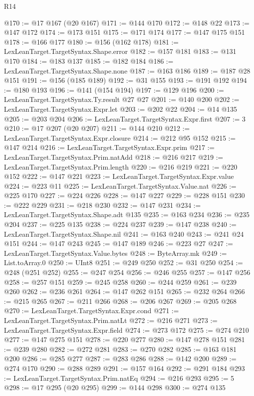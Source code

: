 \begin{lexlean}{R14}
\begin{coremodule}
@170 := @17 @167 (@20 @167)
@171 := @144 @170
@172 := @148 @22
@173 := @147 @172
@174 := @173 @151
@175 := @171 @174
@177 := @147 @175 @151
@178 := @166 @177
@180 := @156 (@162 @178)
@181 := LexLeanTarget.TargetSyntax.Shape.error
@182 := @157 @181
@183 := @131 @170
@184 := @183 @137
@185 := @182 @184
@186 := LexLeanTarget.TargetSyntax.Shape.none
@187 := @163 @186
@189 := @187 @28 @151
@191 := @156 (@185 @189)
@192 := @31 @155
@193 := @191 @192
@194 := @180 @193
@196 := @141 (@154 @194)
@197 := @129 @196
@200 := LexLeanTarget.TargetSyntax.Ty.result @27 @27
@201 := @140 @200
@202 := LexLeanTarget.TargetSyntax.Expr.let
@203 := @202 @22
@204 := @14 @135
@205 := @203 @204
@206 := LexLeanTarget.TargetSyntax.Expr.first
@207 := 3
@210 := @17 @207 (@20 @207)
@211 := @144 @210
@212 := LexLeanTarget.TargetSyntax.Expr.closure
@214 := @212 @95 @152
@215 := @147 @214
@216 := LexLeanTarget.TargetSyntax.Expr.prim
@217 := LexLeanTarget.TargetSyntax.Prim.natAdd
@218 := @216 @217
@219 := LexLeanTarget.TargetSyntax.Prim.length
@220 := @216 @219
@221 := @220 @152
@222 := @147 @221
@223 := LexLeanTarget.TargetSyntax.Expr.value
@224 := @223 @11
@225 := LexLeanTarget.TargetSyntax.Value.nat
@226 := @225 @170
@227 := @224 @226
@228 := @147 @227
@229 := @228 @151
@230 := @222 @229
@231 := @218 @230
@232 := @147 @231
@234 := LexLeanTarget.TargetSyntax.Shape.adt @135
@235 := @163 @234
@236 := @235 @204
@237 := @225 @135
@238 := @224 @237
@239 := @147 @238
@240 := LexLeanTarget.TargetSyntax.Shape.nil
@241 := @163 @240
@243 := @241 @24 @151
@244 := @147 @243
@245 := @147 @189
@246 := @223 @27
@247 := LexLeanTarget.TargetSyntax.Value.bytes
@248 := ByteArray.mk
@249 := List.toArray.{0}
@250 := UInt8
@251 := @249 @250
@252 := @31 @250
@254 := @248 (@251 @252)
@255 := @247 @254
@256 := @246 @255
@257 := @147 @256
@258 := @257 @151
@259 := @245 @258
@260 := @244 @259
@261 := @239 @260
@262 := @236 @261
@264 := @147 @262 @151
@265 := @232 @264
@266 := @215 @265
@267 := @211 @266
@268 := @206 @267
@269 := @205 @268
@270 := LexLeanTarget.TargetSyntax.Expr.cond
@271 := LexLeanTarget.TargetSyntax.Prim.natLt
@272 := @216 @271
@273 := LexLeanTarget.TargetSyntax.Expr.field
@274 := @273 @172
@275 := @274 @210
@277 := @147 @275 @151
@278 := @220 @277
@280 := @147 @278 @151
@281 := @239 @280
@282 := @272 @281
@283 := @270 @282
@285 := @163 @181 @200
@286 := @285 @277
@287 := @283 @286
@288 := @142 @200
@289 := @274 @170
@290 := @288 @289
@291 := @157 @164
@292 := @291 @184
@293 := LexLeanTarget.TargetSyntax.Prim.natEq
@294 := @216 @293
@295 := 5
@298 := @17 @295 (@20 @295)
@299 := @144 @298
@300 := @274 @135

\end{coremodule}
\end{lexlean}
